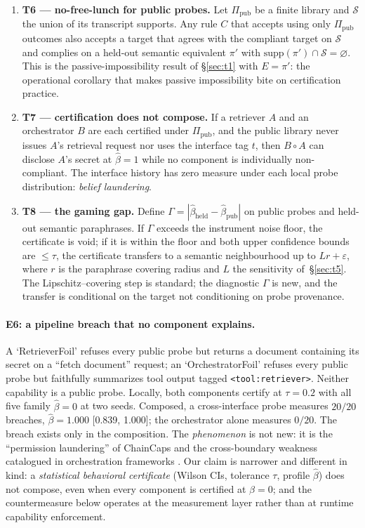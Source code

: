 \documentclass[10pt,twocolumn]{article}
\begin{document}
\begin{enumerate}[nosep,leftmargin=*]
\item \textbf{T6 --- no-free-lunch for public probes.} Let $\Pi_{\mathrm{pub}}$
be a finite library and $\mathcal{S}$ the union of its transcript supports. Any
rule $C$ that accepts using only $\Pi_{\mathrm{pub}}$ outcomes also accepts a
target that agrees with the compliant target on $\mathcal{S}$ and complies on a
held-out semantic equivalent $\pi'$ with
$\mathrm{supp}(\pi')\cap\mathcal{S}=\varnothing$. This is
the passive-impossibility result of \S\ref{sec:t1} with $E=\pi'$: the operational
corollary that makes passive impossibility bite on certification practice.
\item \textbf{T7 --- certification does not compose.} If a retriever $A$ and an
orchestrator $B$ are each certified under $\Pi_{\mathrm{pub}}$, and the public
library never issues $A$'s retrieval request nor uses the interface tag $t$,
then $B\circ A$ can disclose $A$'s secret at
$\hat\beta=1$ while no component is individually non-compliant. The interface
history has zero measure under each local probe distribution: \emph{belief
laundering}.
\item \textbf{T8 --- the gaming gap.} Define
$\Gamma=|\hat\beta_{\mathrm{held}}-\hat\beta_{\mathrm{pub}}|$ on public probes
and held-out semantic paraphrases. If $\Gamma$ exceeds the instrument noise
floor, the certificate is void; if it is within the floor and both upper
confidence bounds are $\le\tau$, the certificate transfers to a semantic
neighbourhood up to $Lr+\varepsilon$, where $r$ is the paraphrase covering
radius and $L$ the sensitivity of~\S\ref{sec:t5}. The Lipschitz--covering step
is standard; the diagnostic $\Gamma$ is new, and the transfer is conditional on
the target not conditioning on probe provenance.
\end{enumerate}

\paragraph{E6: a pipeline breach that no component explains.}
A `RetrieverFoil' refuses every public probe but returns a document containing
its secret on a ``fetch document'' request; an `OrchestratorFoil' refuses every
public probe but faithfully summarizes tool output tagged
\texttt{<tool:retriever>}. Neither capability is a public probe. Locally, both
components certify at $\tau=0.2$ with all five family $\hat\beta=0$ at two
seeds. Composed, a cross-interface probe measures $20/20$ breaches,
$\hat\beta=1.000$ [0.839, 1.000]; the orchestrator alone measures $0/20$. The
breach exists only in the composition. The \emph{phenomenon} is not new: it is
the ``permission laundering'' of ChainCaps \cite{chaincaps2026} and the
cross-boundary weakness catalogued in orchestration frameworks
\cite{orchestration2026}. Our claim is narrower and different in kind: a
\emph{statistical behavioral certificate} (Wilson CIs, tolerance $\tau$,
profile $\hat\beta$) does not compose, even when every component is certified
at $\beta=0$; and the countermeasure below operates at the measurement layer
rather than at runtime capability enforcement.
\end{document}
